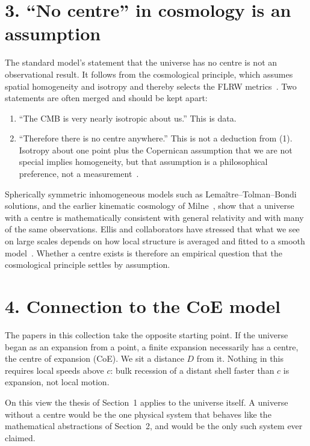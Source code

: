 \documentclass[11pt,a4paper]{article}
\begin{document}
\section*{3. ``No centre'' in cosmology is an assumption}
The standard model's statement that the universe has no centre is not an observational result. It follows from the cosmological principle, which assumes spatial homogeneity and isotropy and thereby selects the FLRW metrics~\cite{rindler,ellis79}. Two statements are often merged and should be kept apart:
\begin{enumerate}
\item ``The CMB is very nearly isotropic about us.'' This is data.
\item ``Therefore there is no centre anywhere.'' This is not a deduction from (1). Isotropy about one point plus the Copernican assumption that we are not special implies homogeneity, but that assumption is a philosophical preference, not a measurement~\cite{ellis79,ellis02}.
\end{enumerate}
Spherically symmetric inhomogeneous models such as Lema\^itre--Tolman--Bondi solutions, and the earlier kinematic cosmology of Milne~\cite{milne}, show that a universe with a centre is mathematically consistent with general relativity and with many of the same observations. Ellis and collaborators have stressed that what we see on large scales depends on how local structure is averaged and fitted to a smooth model~\cite{ellis02,ellisstoeger}. Whether a centre exists is therefore an empirical question that the cosmological principle settles by assumption.
\section*{4. Connection to the CoE model}
The papers in this collection take the opposite starting point. If the universe began as an expansion from a point, a finite expansion necessarily has a centre, the centre of expansion (CoE). We sit a distance $D$ from it. Nothing in this requires local speeds above $c$: bulk recession of a distant shell faster than $c$ is expansion, not local motion.

On this view the thesis of Section~1 applies to the universe itself. A universe without a centre would be the one physical system that behaves like the mathematical abstractions of Section~2, and would be the only such system ever claimed.
\end{document}
